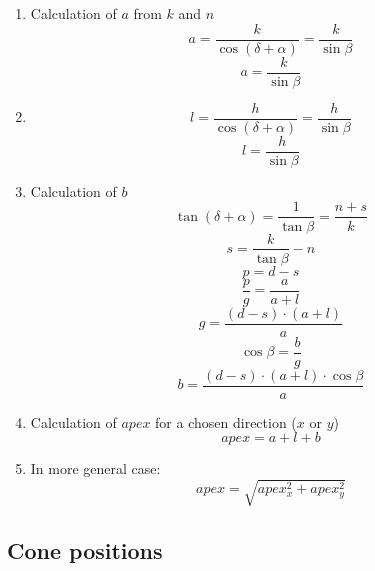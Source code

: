 \documentclass[12pt]{article}
\begin{document}
\begin{enumerate}
%	
\item Calculation of $a$ from $k$ and $n$
	$$a=\frac{k}{\cos(\delta+\alpha)}=\frac{k}{\sin\beta}$$
	  \begin{equation} 	
	\boxed{a=\frac{k}{\sin\beta}}
	\end{equation}
\item 				
	$$l=\frac{h}{\cos(\delta+\alpha)}=\frac{h}{\sin\beta}$$
	  \begin{equation} 	
	\boxed{l=\frac{h}{\sin\beta}}
	\end{equation}
\item Calculation of $b$ 
	$$\tan(\delta+\alpha)=\frac{1}{\tan{\beta}} =\frac{n+s}{k}$$
	  \begin{equation} 	
	\boxed{s=\frac{k}{\tan{\beta}}-n}
	\end{equation}
	$$p=d-s$$
	$$\frac{p}{g}=\frac{a}{a+l}$$
	$$g=\frac{(d-s)\cdot(a+l)}{a}$$ 
	$$\cos\beta=\frac{b}{g}$$
	  \begin{equation} 	
	\boxed{b=\frac{(d-s)\cdot(a+l)\cdot\cos\beta}{a}}
	\end{equation}
\item Calculation of $apex$ for a chosen direction ($x$ or $y$)
\begin{equation} 
	\boxed{apex=a+l+b}			
\end{equation}	
\item In more general case: 
\begin{equation} 
	\boxed{apex=\sqrt{apex_{x}^{2}+apex_{y}^{2}}}			
\end{equation}


	
\end{enumerate}

 
 
 
\subsection{Cone positions}
 
\end{document}
